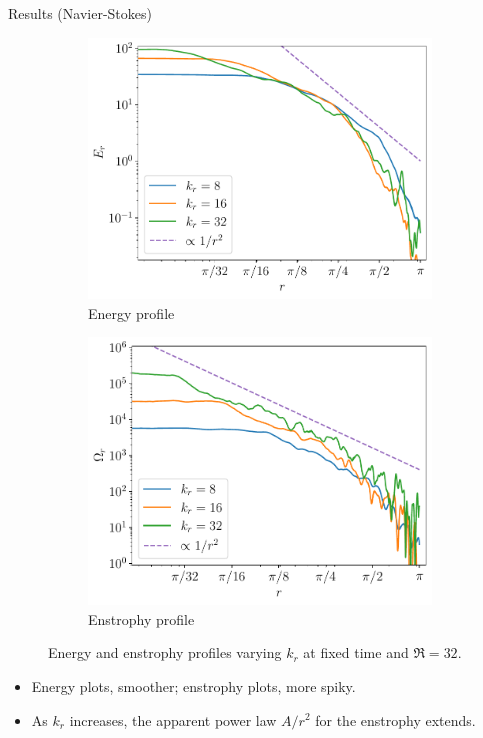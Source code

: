 \documentclass{beamer} %
\begin{document}
\begin{frame}{Results (Navier-Stokes)}
	\begin{figure}[!ht]
		\centering
		\begin{subfigure}{0.44\textwidth}
			\centering
			\includegraphics[width=\textwidth]{../images/Energy_kdn.test7.059.pdf}
			\caption{Energy profile}
		\end{subfigure}\hspace{0.04\textwidth}
		\begin{subfigure}{0.44\textwidth}
			\centering
			\includegraphics[width=\textwidth]{../images/Enstrophy_kdn.test7.059.pdf}
			\caption{Enstrophy profile}
		\end{subfigure}
		\caption{Energy and enstrophy profiles varying $k_r$ at fixed time and $\Re=32$.}
	\end{figure}
	\begin{itemize}
		\item Energy plots, smoother; enstrophy plots, more spiky.
		\item As $k_r$ increases, the apparent power law $A/r^2$ for the enstrophy extends.
	\end{itemize}
\end{frame}
\end{document}
